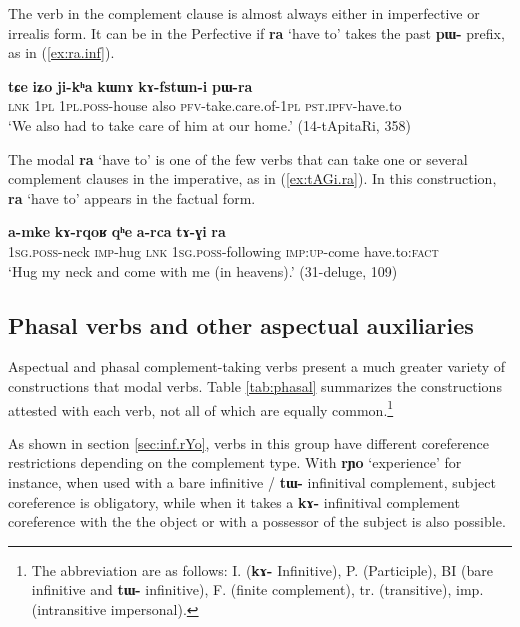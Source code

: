 \documentclass[oneside,a4paper,11pt]{article}
\newcommand{\ipa}[1]{\textbf{\phon#1}} %
\newcommand{\jpg}[2]{\ipa{#1} `#2'} %
\newcommand{\refb}[1]{(\ref{#1})}
\begin{document}
The verb in the complement clause is almost always either in imperfective or irrealis form. It can be in the Perfective if \jpg{ra}{have to} takes the past \ipa{pɯ-} prefix, as in (\ref{ex:ra.inf}).

 \begin{exe}
\ex \label{ex:kAfstWni}
\gll 
\ipa{tɕe} 	\ipa{iʑo} 	\ipa{ji-kʰa} 	\ipa{kɯnɤ} 	\ipa{kɤ-fstɯn-i} 	\ipa{pɯ-ra} \\
\textsc{lnk} \textsc{1pl} \textsc{1pl.poss}-house also \textsc{pfv}-take.care.of-\textsc{1pl} \textsc{pst.ipfv}-have.to \\
\glt `We also had to take care of him at our home.' (14-tApitaRi, 358)
\end{exe}  

The modal \jpg{ra}{have to}  is one of the few verbs that can take one or several complement clauses in the imperative, as in \refb{ex:tAGi.ra}. In this construction, \jpg{ra}{have to} appears in the factual form.

\begin{exe}
\ex \label{ex:tAGi.ra}
\gll \ipa{a-mke} 	\ipa{kɤ-rqoʁ} 	\ipa{qʰe} 	\ipa{a-rca} 	\ipa{tɤ-ɣi} 	\ipa{ra}  \\
\textsc{1sg.poss}-neck \textsc{imp}-hug \textsc{lnk} \textsc{1sg.poss}-following \textsc{imp:up}-come have.to:\textsc{fact} \\
\glt `Hug my neck and come with me (in heavens).' (31-deluge, 109)
\end{exe}

  \subsection{Phasal verbs and other aspectual auxiliaries}
Aspectual and phasal complement-taking verbs present a  much greater variety of constructions that modal verbs. Table \ref{tab:phasal} summarizes the constructions attested with each verb, not all of which are equally common.\footnote{The abbreviation are as follows: 	I. (\ipa{kɤ-} Infinitive), P.  (Participle), 	BI (bare infinitive and \ipa{tɯ-} infinitive), 	F. (finite complement), tr. (transitive), imp. (intransitive impersonal). }  

As shown in section \ref{sec:inf.rYo}, verbs in this group have different coreference restrictions depending on the complement type. With  \jpg{rɲo}{experience} for instance, when used with a bare infinitive / \ipa{tɯ-} infinitival complement, subject coreference is obligatory, while when it takes a \ipa{kɤ-} infinitival complement coreference with the the object or with a possessor of the subject is also possible.
\end{document}
